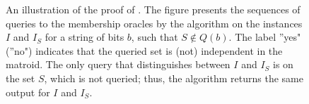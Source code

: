 \documentclass[11pt,letter]{article}
\begin{document}
\begin{figure}
\begin{center}
\begin{tikzpicture}[ultra thick,scale=1.1, every node/.style={scale=1}]
		
		\end{tikzpicture}
	\end{center}
	\caption{\label{fig:proof} An illustration of the proof of . The figure presents the sequences of queries to the membership oracles by the algorithm on the instances $I$ and $I_S$ for a string of bits $b$, such that $S \notin Q(b)$. The label ''yes" (''no") indicates that the queried set is (not) independent in the matroid. 
		The only query that distinguishes between $I$ and $I_S$ is on the set $S$, which is not queried; thus, the algorithm returns the same output for $I$ and $I_S$.}
\end{figure}
\end{document}
